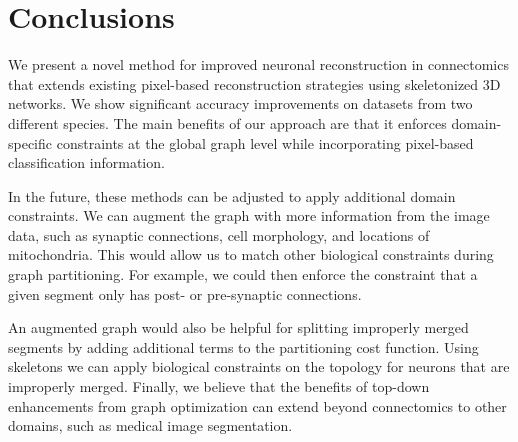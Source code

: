 \section{Conclusions}

We present a novel method for improved neuronal reconstruction in connectomics that extends existing pixel-based reconstruction strategies using skeletonized 3D networks. 
We show significant accuracy improvements on datasets from two different species. 
The main benefits of our approach are that it enforces domain-specific constraints at the global graph level while incorporating pixel-based classification information.

In the future, these methods can be adjusted to apply additional domain constraints. 
We can augment the graph with more information from the image data, such as synaptic connections, cell morphology, and locations of mitochondria. 
This would allow us to match other biological constraints during graph partitioning. 
For example, we could then enforce the constraint that a given segment only has post- or pre-synaptic connections. 

An augmented graph would also be helpful for splitting improperly merged segments by adding additional terms to the partitioning cost function. 
Using skeletons we can apply biological constraints on the topology for neurons that are improperly merged.
Finally, we believe that the benefits of top-down enhancements from graph optimization can extend beyond connectomics to other domains, such as medical image segmentation.